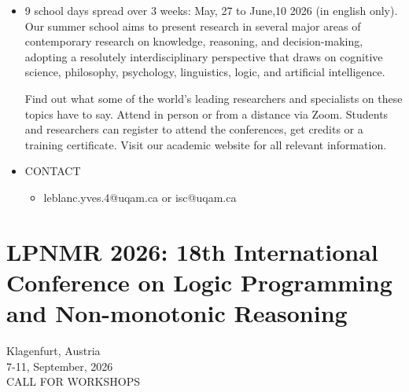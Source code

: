 \documentclass[prodmode,acmtecs]{acmsmall} %
\begin{document}
\begin{itemize}\item  9 school days spread over 3 weeks: May, 27 to June,10 2026 (in english only). Our summer school aims to present research in several major areas of contemporary research on knowledge, reasoning, and decision-making, adopting a resolutely interdisciplinary perspective that draws on cognitive science, philosophy, psychology, linguistics, logic, and artificial intelligence.  
 
  Find out what some of the world’s leading researchers and specialists on these topics have to say. Attend in person or from a distance via Zoom. Students and researchers can register to attend the conferences, get credits or a training certificate. Visit our academic website for all relevant information.  
 
\item  CONTACT 
 
\begin{itemize}\item  leblanc.yves.4@uqam.ca or isc@uqam.ca
\end{itemize} 
\end{itemize}\section{LPNMR 2026: 18th International Conference on Logic Programming and Non-monotonic Reasoning}\label{LPNMR2026}  Klagenfurt, Austria\\ 
  7-11, September, 2026\\ 
CALL FOR WORKSHOPS 
\end{document}

